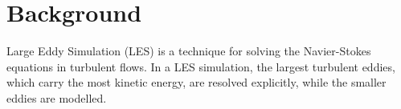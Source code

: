 \section{Background}
Large Eddy Simulation (LES) is a technique for solving the Navier-Stokes equations in turbulent flows. In a LES simulation, the largest turbulent eddies, which carry the most kinetic energy, are resolved explicitly, while the smaller eddies are modelled. 



